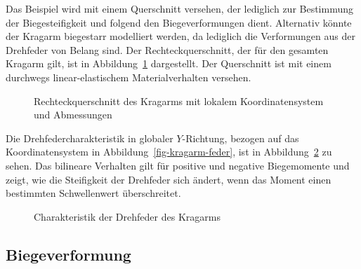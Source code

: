 \documentclass[
  11pt,
  letterpaper,
]{scrreprt}
\begin{document}
Das Beispiel wird mit einem Querschnitt versehen, der lediglich zur
Bestimmung der Biegesteifigkeit und folgend den Biegeverformungen dient.
Alternativ könnte der Kragarm biegestarr modelliert werden, da lediglich
die Verformungen aus der Drehfeder von Belang sind. Der
Rechteckquerschnitt, der für den gesamten Kragarm gilt, ist in
Abbildung~\ref{fig-qs-kragarm} dargestellt. Der Querschnitt ist mit
einem durchwegs linear-elastischem Materialverhalten versehen.

\begin{figure}[H]


\caption{\label{fig-qs-kragarm}Rechteckquerschnitt des Kragarms mit
lokalem Koordinatensystem und Abmessungen}

\end{figure}%

Die Drehfedercharakteristik in globaler \(Y\)-Richtung, bezogen auf das
Koordinatensystem in Abbildung~\ref{fig-kragarm-feder}, ist in
Abbildung~\ref{fig-springcharacteristic} zu sehen. Das bilineare
Verhalten gilt für positive und negative Biegemomente und zeigt, wie die
Steifigkeit der Drehfeder sich ändert, wenn das Moment einen bestimmten
Schwellenwert überschreitet.

\begin{figure}[H]


\caption{\label{fig-springcharacteristic}Charakteristik der Drehfeder
des Kragarms}

\end{figure}%

\subsection{Biegeverformung}\label{biegeverformung}
\end{document}
